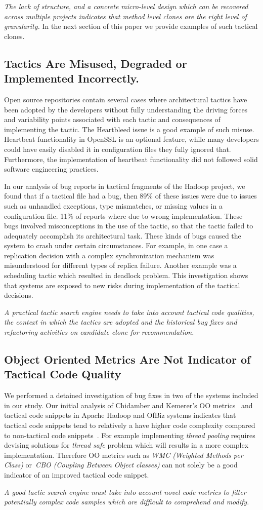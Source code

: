 \textit{The lack of structure, and a concrete micro-level design which can be recovered across multiple projects indicates that method level clones are the right level of granularity. } In the next section of this paper we provide examples of such tactical clones.

\subsection{Tactics Are Misused, Degraded or Implemented Incorrectly.} Open source repositories contain several cases where architectural tactics have been adopted by the developers without fully understanding the driving forces and variability points \cite{FSE2012} associated with each tactic and consequences of implementing the tactic. The Heartbleed issue is a good example of such misuse. Heartbeat functionality in OpenSSL is an optional feature, while many developers could have easily disabled it in configuration files they fully ignored that. Furthermore, the implementation of heartbeat functionality did not followed solid software engineering practices.

In our analysis of bug reports in tactical fragments of the Hadoop project, we found that if a tactical file had a bug, then 89\% of these issues were due to issues such as unhandled exceptions, type mismatches, or missing values in a configuration file.
11\% of reports where due to wrong implementation. These bugs involved misconceptions in the use of the tactic, so that the tactic failed to adequately accomplish its architectural task.  These kinds of bugs caused the system to crash under certain circumstances. For example, in one case a replication decision with a complex synchronization mechanism was misunderstood for different types of replica failure. Another example was a scheduling tactic which resulted in deadlock problem. This investigation shows that systems are exposed to new risks during implementation of the tactical decisions. 

\textit{A practical tactic search engine needs to take into account tactical code qualities, the context in which the tactics are adopted and the historical bug fixes and refactoring activities on candidate clone for recommendation.} 


\subsection{Object Oriented Metrics Are Not Indicator of Tactical Code Quality}
We performed a detained investigation of bug fixes in two of the systems included in our study. Our initial analysis of Chidamber and Kemerer's OO metrics~\cite{491650} and tactical code snippets in Apache Hadoop and OfBiz systems indicates that tactical code snippets tend to relatively a have higher code complexity compared to non-tactical code snippets~\cite{MSRBuble}. For example implementing \textit{thread pooling} requires devising solutions for \textit{thread safe} problem which will results in a more complex implementation. Therefore OO metrics such as \emph{WMC (Weighted Methods per Class)} or~\emph{CBO (Coupling Between Object classes)} can not solely be a good indicator of an improved tactical code snippet. 

\textit{A good tactic search engine must take into account novel code metrics to filter potentially complex code samples which are difficult to comprehend and modify.}